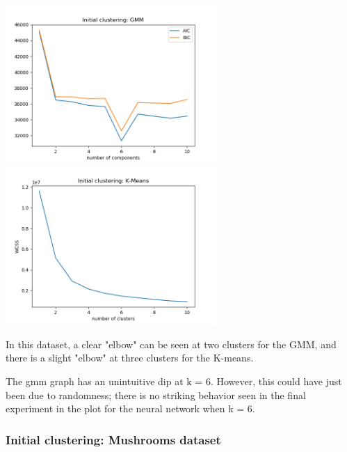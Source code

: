 \documentclass[11pt]{article}
\begin{document}
            \includegraphics[width=8cm]{../pima/clustering1/gmm_init.png}
            \includegraphics[width=8cm]{../pima/clustering1/km_init.png}

            In this dataset, a clear "elbow" can be seen at two clusters for the GMM,
            and there is a slight "elbow" at three clusters for the K-means.

            The gmm graph has an unintuitive dip at k = 6. However, this could
            have just been due to randomness; there is no striking behavior seen
            in the final experiment in the plot for the neural network when k = 6.
            

            \subsubsection{Initial clustering: Mushrooms dataset}
\end{document}
